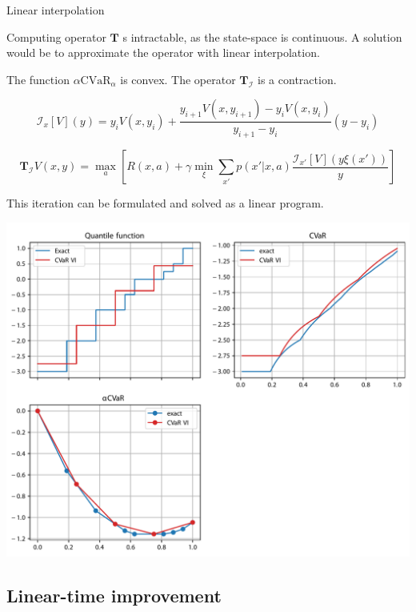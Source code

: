 \documentclass{beamer}
\newcommand{\cvar}{\text{CVaR}}
\newcommand{\bsquare}[1]{\left[ {#1} \right]}
\newcommand{\interpI}{\mathcal{I}}
\begin{document}
\begin{frame}{Linear interpolation}

Computing operator $\mathbf{T}$ s intractable, as the state-space is continuous. A solution would be to approximate the operator with linear interpolation.

\begin{theorem}
The function $\alpha\cvar_\alpha$ is convex. The operator $\mathbf{T}_\interpI$ is a contraction.

$$\interpI_{x}[V](y)=y_iV(x,y_{i})+\frac{y_{i+1}V(x,y_{i+1})-y_iV(x,y_{i})}{y_{i+1}-y_i}(y-y_i)$$

$$\mathbf{T}_\interpI V(x, y) = \max_a \bsquare{ R(x, a) + \gamma \min_{\xi} \sum_{x'} p(x'| x, a)\dfrac{\interpI_{x'} [V](y\xi(x'))}{y}}$$

\end{theorem}

This iteration can be formulated and solved as a linear program.

\end{frame}


\begin{frame}
\center
\includegraphics[width=0.8\linewidth]{../gfx/exactvarcvar.pdf}
\end{frame}



\subsection{Linear-time improvement}
\end{document}
